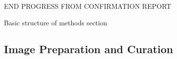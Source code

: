 END PROGRESS FROM CONFIRMATION REPORT 



\label{sec:methods}
  Basic structure of methods section
  
  \subsection{Image Preparation and Curation} %
  \label{sub:image_preparation_and_curation}
    \begin{figure}
      \centering

\end{figure}
